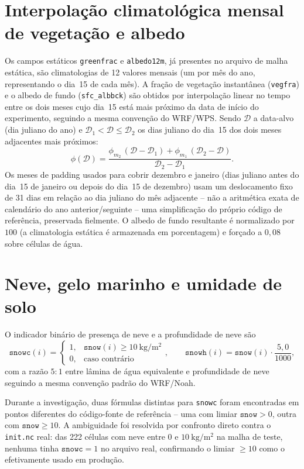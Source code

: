 \section{Interpolação climatológica mensal de vegetação e albedo}
\label{sec:monthly_interp}

Os campos estáticos \texttt{greenfrac} e \texttt{albedo12m}, já presentes
no arquivo de malha estática, são climatologias de 12 valores mensais
(um por mês do ano, representando o dia~15 de cada mês). A fração de
vegetação instantânea (\texttt{vegfra}) e o albedo de fundo
(\texttt{sfc\_albbck}) são obtidos por interpolação linear no tempo entre
os dois meses cujo dia~15 está mais próximo da data de início do
experimento, seguindo a mesma convenção do WRF/WPS. Sendo $\mathcal{D}$
a data-alvo (dia juliano do ano) e $\mathcal{D}_1 < \mathcal{D} \le
\mathcal{D}_2$ os dias juliano do dia~15 dos dois meses adjacentes mais
próximos:
\begin{equation}
  \phi(\mathcal{D}) = \frac{\phi_{m_2}\,(\mathcal{D}-\mathcal{D}_1) + \phi_{m_1}\,(\mathcal{D}_2-\mathcal{D})}{\mathcal{D}_2 - \mathcal{D}_1}.
  \label{eq:monthly_interp}
\end{equation}
Os meses de padding usados para cobrir dezembro e janeiro (dias juliano
antes do dia~15 de janeiro ou depois do dia~15 de dezembro) usam um
deslocamento fixo de 31 dias em relação ao dia juliano do mês adjacente
-- não a aritmética exata de calendário do ano anterior/seguinte -- uma
simplificação do próprio código de referência, preservada fielmente.
O albedo de fundo resultante é normalizado por $100$ (a climatologia
estática é armazenada em porcentagem) e forçado a $0{,}08$ sobre células
de água.

\section{Neve, gelo marinho e umidade de solo}

O indicador binário de presença de neve e a profundidade de neve são
\begin{equation}
  \texttt{snowc}(i) =
  \begin{cases} 1, & \texttt{snow}(i) \ge \SI{10}{\kilo\gram\per\meter\squared} \\ 0, & \text{caso contrário} \end{cases},
  \qquad
  \texttt{snowh}(i) = \texttt{snow}(i)\cdot\frac{5{,}0}{1000},
  \label{eq:snow}
\end{equation}
com a razão $5{:}1$ entre lâmina de água equivalente e profundidade de
neve seguindo a mesma convenção padrão do WRF/Noah.
\begin{caixaachado}
Durante a investigação, duas fórmulas distintas para \texttt{snowc}
foram encontradas em pontos diferentes do código-fonte de referência --
uma com limiar $\texttt{snow}>0$, outra com $\texttt{snow}\ge 10$. A
ambiguidade foi resolvida por confronto direto contra o \texttt{init.nc}
real: das 222 células com neve entre $0$ e $\SI{10}{\kilo\gram\per\meter\squared}$
na malha de teste, nenhuma tinha $\texttt{snowc}=1$ no arquivo real,
confirmando o limiar $\ge 10$ como o efetivamente usado em produção.
\end{caixaachado}

